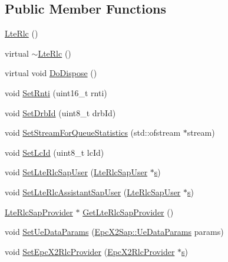 \subsection*{Public Member Functions}
\begin{DoxyCompactItemize}
\item 
\hyperlink{classns3_1_1LteRlc_a7204bd3f846a0f5d8c620cad57eceffd}{Lte\+Rlc} ()
\item 
virtual \hyperlink{classns3_1_1LteRlc_ae5bb469e99036dfd2d4f01df90ac32fc}{$\sim$\+Lte\+Rlc} ()
\item 
virtual void \hyperlink{classns3_1_1LteRlc_a6abc1e07937a04aabd869fedcc43371e}{Do\+Dispose} ()
\item 
void \hyperlink{classns3_1_1LteRlc_aaa523544e1f9a29104a343333741f498}{Set\+Rnti} (uint16\+\_\+t rnti)
\item 
void \hyperlink{classns3_1_1LteRlc_ab73c5a8d19578d404944469140eda17b}{Set\+Drb\+Id} (uint8\+\_\+t drb\+Id)
\item 
void \hyperlink{classns3_1_1LteRlc_a5bc135cf8bb421b6421029aca613309e}{Set\+Stream\+For\+Queue\+Statistics} (std\+::ofstream $\ast$stream)
\item 
void \hyperlink{classns3_1_1LteRlc_aef0c2915410d97b67d6f659651ce626f}{Set\+Lc\+Id} (uint8\+\_\+t lc\+Id)
\item 
void \hyperlink{classns3_1_1LteRlc_a745f75219a16b0223786514395f7a43b}{Set\+Lte\+Rlc\+Sap\+User} (\hyperlink{classns3_1_1LteRlcSapUser}{Lte\+Rlc\+Sap\+User} $\ast$\hyperlink{generate__test__data__lte__sinr_8m_ad83eeb3a142285d1243a08c6b7026df8}{s})
\item 
void \hyperlink{classns3_1_1LteRlc_a2bb862423ada211e9863368f5c3c7cf3}{Set\+Lte\+Rlc\+Assistant\+Sap\+User} (\hyperlink{classns3_1_1LteRlcSapUser}{Lte\+Rlc\+Sap\+User} $\ast$\hyperlink{generate__test__data__lte__sinr_8m_ad83eeb3a142285d1243a08c6b7026df8}{s})
\item 
\hyperlink{classns3_1_1LteRlcSapProvider}{Lte\+Rlc\+Sap\+Provider} $\ast$ \hyperlink{classns3_1_1LteRlc_afa179b42c75c75077ead4c8922296fbe}{Get\+Lte\+Rlc\+Sap\+Provider} ()
\item 
void \hyperlink{classns3_1_1LteRlc_a77e5f6a2ead063c8d9f6608b55fd07d9}{Set\+Ue\+Data\+Params} (\hyperlink{structns3_1_1EpcX2Sap_1_1UeDataParams}{Epc\+X2\+Sap\+::\+Ue\+Data\+Params} params)
\item 
void \hyperlink{classns3_1_1LteRlc_ad8bb046a0974170c8dcf8762fc48319a}{Set\+Epc\+X2\+Rlc\+Provider} (\hyperlink{classns3_1_1EpcX2RlcProvider}{Epc\+X2\+Rlc\+Provider} $\ast$\hyperlink{generate__test__data__lte__sinr_8m_ad83eeb3a142285d1243a08c6b7026df8}{s})

\end{DoxyCompactItemize}
